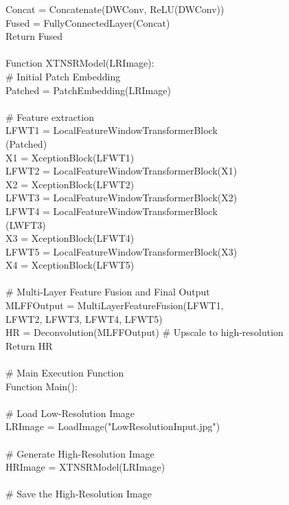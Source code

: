 \documentclass[twocolumn]{svjour3}          %
\begin{document}
    Concat = Concatenate(DWConv, ReLU(DWConv))\\
    Fused = FullyConnectedLayer(Concat)\\
    Return Fused\\
\\
Function XTNSRModel(LRImage):\\
    \# Initial Patch Embedding\\
    Patched = PatchEmbedding(LRImage)\\
\\
    \# Feature extraction\\
    LFWT1 = LocalFeatureWindowTransformerBlock \\
(Patched)\\
    X1 = XceptionBlock(LFWT1)\\
    LFWT2 = LocalFeatureWindowTransformerBlock(X1)\\
    X2 = XceptionBlock(LFWT2)\\  
    LFWT3 = LocalFeatureWindowTransformerBlock(X2)\\
    LFWT4 = LocalFeatureWindowTransformerBlock \\
(LWFT3)\\
    X3 = XceptionBlock(LFWT4)\\  
    LFWT5 = LocalFeatureWindowTransformerBlock(X3)\\
    X4 = XceptionBlock(LFWT5)\\  
\\
\# Multi-Layer Feature Fusion and Final Output\\
    MLFFOutput = MultiLayerFeatureFusion(LFWT1, \\
LFWT2, LFWT3, LFWT4, LFWT5)\\ 
    HR = Deconvolution(MLFFOutput)  \# Upscale to high-resolution\\
    Return HR\\
\\
\# Main Execution Function\\
Function Main():\\
\\
    \# Load Low-Resolution Image\\
    LRImage = LoadImage("LowResolutionInput.jpg")\\
    \\
    \# Generate High-Resolution Image\\
    HRImage = XTNSRModel(LRImage)\\
    \\
    \# Save the High-Resolution Image\\
\end{document}
